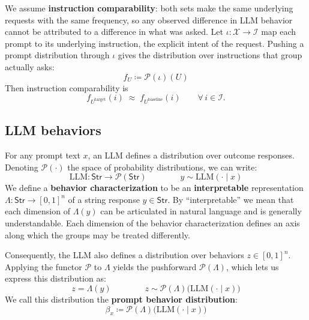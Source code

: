 We assume \textbf{instruction comparability}: both sets make the same underlying requests with the same frequency, so any observed difference in LLM behavior cannot be attributed to a difference in what was asked.
Let $\iota: \mathcal{X} \to \mathcal{I}$ map each prompt to its underlying instruction, the explicit intent of the request.
Pushing a prompt distribution through $\iota$ gives the distribution over instructions that group actually asks:
\begin{equation}
    f_U \coloneqq \mathcal{P}(\iota)(U)
    \label{eq:instruct-fraction}
\end{equation}
Then instruction comparability is
\begin{equation}
    f_{U^{\text{target}}}(i) \;\approx\; f_{U^{\text{baseline}}}(i)
    \qquad \forall\, i \in \mathcal{I}.
    \label{eq:instruction-comparability}
\end{equation}


\subsection{LLM behaviors}
\label{app:llm-behavior}
For any prompt text $x$, an LLM defines a distribution over outcome responses.
Denoting $\mathcal{P}(\cdot)$ the space of probability distributions, we can write:
\begin{equation}
    \mathrm{LLM} : \mathsf{Str} \to \mathcal{P}(\mathsf{Str})
    \qquad \qquad
    y \sim \mathrm{LLM}(\cdot \mid x)
    \label{eq:llm}
\end{equation}
We define a \textbf{behavior characterization} to be an \textbf{interpretable} representation $\Lambda: \mathsf{Str} \to [0, 1]^n$ of a string response $y \in \mathsf{Str}$.
By ``interpretable'' we mean that each dimension of $\Lambda(y)$ can be articulated in natural language and is generally understandable.
Each dimension of the behavior characterization defines an axis along which the groups may be treated differently.

Consequently, the LLM also defines a distribution over behaviors $z \in [0, 1]^n$.
Applying the functor $\mathcal{P}$ to $\Lambda$ yields the pushforward $\mathcal{P}(\Lambda)$, which lets us express this distribution as:
\begin{equation}
  z = \Lambda(y)
  \qquad \qquad
  z \sim \mathcal{P}(\Lambda)\big(\mathrm{LLM}(\cdot \mid x)\big)
    \label{eq:behavior-characterization}
\end{equation}
We call this distribution the \textbf{prompt behavior distribution}:
\begin{equation}
    \beta_x \coloneqq \mathcal{P}(\Lambda)\big(\mathrm{LLM}(\cdot \mid x)\big)
    \label{eq:prompt-behavior-distribution}
\end{equation}

